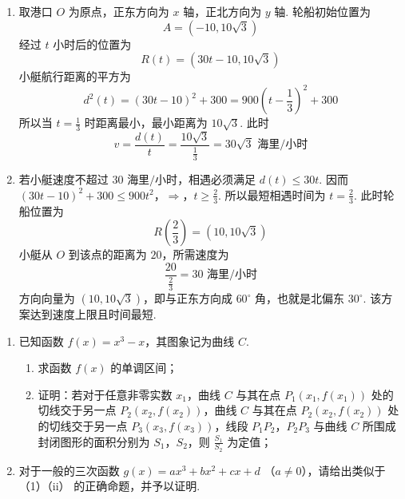 \begin{solution}
\begin{enumerate}
\item 取港口 \(O\) 为原点，正东方向为 \(x\) 轴，正北方向为 \(y\) 轴. 轮船初始位置为
\[
A=(-10,10\sqrt{3})
\]
经过 \(t\) 小时后的位置为
\[
R(t)=(30t-10,10\sqrt{3})
\]
小艇航行距离的平方为
\[
d^{2}(t)=(30t-10)^{2}+300=900\left(t-\frac13\right)^{2}+300
\]
所以当 \(t=\frac13\) 时距离最小，最小距离为 \(10\sqrt3\). 此时
\[
v=\frac{d(t)}{t}=\frac{10\sqrt3}{\frac{1}{3}}=30\sqrt3\text{ 海里/小时}
\]

\item 若小艇速度不超过 \(30\text{ 海里/小时}\)，相遇必须满足 \(d(t)\leqslant30t\). 因而
\((30t-10)^{2}+300\leqslant900t^{2}\)，\(\Longrightarrow\)，\(t\geqslant\frac23\).
所以最短相遇时间为 \(t=\frac23\). 此时轮船位置为
\[
R\left(\frac23\right)=(10,10\sqrt3)
\]
小艇从 \(O\) 到该点的距离为 \(20\)，所需速度为
\[
\frac{20}{\frac{2}{3}}=30\text{ 海里/小时}
\]
方向向量为 \((10,10\sqrt3)\)，即与正东方向成 \(60^{\circ}\) 角，也就是北偏东 \(30^{\circ}\). 该方案达到速度上限且时间最短.
\end{enumerate}
\end{solution}

\begin{problem}
\begin{enumerate}
\item 已知函数 \( f(x) = x^3 - x \)，其图象记为曲线 \(C\).
    \begin{enumerate}
    \item 求函数 \( f(x) \) 的单调区间；
    \item 证明：若对于任意非零实数 \(x_{1}\)，曲线 \(C\) 与其在点 \(P_{1}(x_{1}, f(x_{1}))\) 处的切线交于另一点 \(P_{2}(x_{2}, f(x_{2}))\)，曲线 \(C\) 与其在点 \(P_{2}(x_{2}, f(x_{2}))\) 处的切线交于另一点 \(P_{3}(x_{3}, f(x_{3}))\)，线段 \(P_{1}P_{2}\)，\(P_{2}P_{3}\) 与曲线 \(C\) 所围成封闭图形的面积分别为 \(S_{1}\)，\(S_{2}\)，则 \(\frac{S_{1}}{S_{2}}\) 为定值；
    \end{enumerate}
\item 对于一般的三次函数 \( g(x) = ax^3 + bx^2 + cx + d \) （\(a \neq 0\)），请给出类似于（1）（ii） 的正确命题，并予以证明.
\end{enumerate}
\end{problem}

